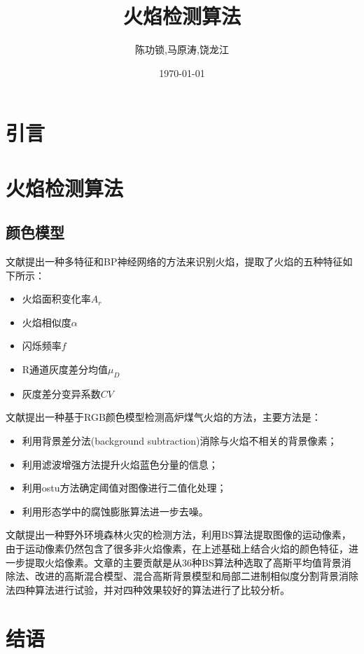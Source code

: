 \documentclass[12pt]{article}
\title{火焰检测算法}
\author{陈功锁,马原涛,饶龙江}
\date{\today}
\begin{document}
\doublespacing
\maketitle

\section{引言}

\section{火焰检测算法}

\subsection{颜色模型}

文献\cite{陈嘉卿基于}提出一种多特征和BP神经网络的方法来识别火焰，提取了火焰的五种特征如下所示：
\begin{itemize}
    \item 火焰面积变化率$ A_r$
    \item 火焰相似度$ \alpha$
    \item 闪烁频率$ f$
    \item R通道灰度差分均值$ \mu_D$
    \item 灰度差分变异系数$ CV$ 
\end{itemize}

文献\cite{周昱基于}提出一种基于RGB颜色模型检测高炉煤气火焰的方法，主要方法是：
\begin{itemize}
    \item 利用背景差分法(background subtraction)消除与火焰不相关的背景像素；
    \item 利用滤波增强方法提升火焰蓝色分量的信息；
    \item 利用ostu方法确定阈值对图像进行二值化处理；
    \item 利用形态学中的腐蚀膨胀算法进一步去噪。
\end{itemize}

文献\cite{陈越2018森林火灾火焰像素检测的背景减除算法}提出一种野外环境森林火灾的检测方法，利用BS算法提取图像的运动像素，由于运动像素仍然包含了很多非火焰像素，在上述基础上结合火焰的颜色特征，进一步提取火焰像素。文章的主要贡献是从36种BS算法种选取了高斯平均值背景消除法、改进的高斯混合模型、混合高斯背景模型和局部二进制相似度分割背景消除法四种算法进行试验，并对四种效果较好的算法进行了比较分析。

\section{结语}


 
\end{document}
